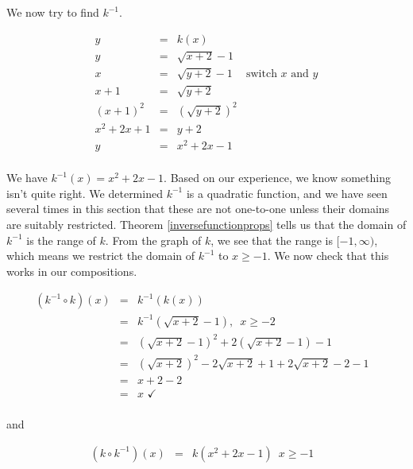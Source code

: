 {\begin{enumerate}
We now try to find $k^{-1}$.

\[ \begin{array}{rclr}

y & = & k(x) & \\

y & = & \sqrt{x+2}-1 & \\

x & = & \sqrt{y+2} - 1 & \mbox{switch $x$ and $y$} \\

x+1 & = & \sqrt{y+2} & \\

(x+1)^2 & = & \left(\sqrt{y+2}\right)^2 & \\

x^2 + 2x + 1 & = & y + 2 & \\

y & = & x^2 + 2x - 1 & \\

\end{array} \]

We have $k^{-1}(x) = x^2+2x-1$.  Based on our experience, we know something isn't quite right.  We determined $k^{-1}$ is a quadratic function, and we have seen several times in this section that these are not one-to-one unless their domains are suitably restricted.  Theorem \ref{inversefunctionprops} tells us that the domain of $k^{-1}$ is the range of $k$.  From the graph of $k$, we see that the range is $[-1, \infty)$, which means we restrict the domain of $k^{-1}$ to $x \geq -1$. We now check that this works in our compositions.

\[ \begin{array}{rclr}

\left(k^{-1} \circ k \right)(x) & = & k^{-1}(k(x)) & \\ 

& = & k^{-1}\left(\sqrt{x+2}-1\right), \, \, \, x \geq -2 & \\
& = & \left(\sqrt{x+2}-1\right)^2 + 2\left(\sqrt{x+2}-1\right) - 1& \\
& = & \left(\sqrt{x+2}\right)^2 - 2\sqrt{x+2} + 1 + 2 \sqrt{x+2} - 2 - 1 & \\
& = &x+2 -2  & \\
& = & x \, \, \checkmark &\\
\end{array}\]

and


\[ \begin{array}{rclr}

\left(k \circ k^{-1} \right)(x) & = & k\left( x^2+2x-1 \right) \, \, \, x \geq -1 & \\ 


\end{array}\]
\end{enumerate}}
